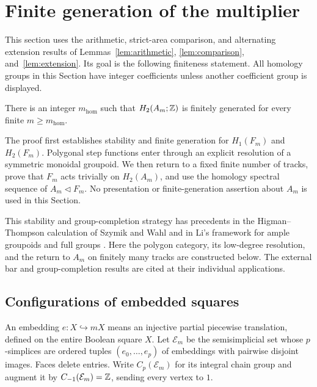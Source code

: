 \section{Finite generation of the multiplier}\label{sec:homology}

This section uses the arithmetic, strict-area comparison, and alternating
extension results of Lemmas~\ref{lem:arithmetic}, \ref{lem:comparison},
and~\ref{lem:extension}.  Its goal is
the following finiteness statement.  All homology groups in this Section have
integer coefficients unless another coefficient group is displayed.

\begin{theorem}\label{thm:multiplier}
There is an integer $m_{\mathrm{hom}}$ such that
$H_2(A_m;\mathbb Z)$ is finitely generated for every finite $m\geq m_{\mathrm{hom}}$.
\end{theorem}

The proof first establishes stability and finite generation for
$H_1(F_m)$ and $H_2(F_m)$.  Polygonal step functions enter through an explicit
resolution of a symmetric monoidal groupoid.  We then return to a fixed finite
number of tracks, prove that $F_m$ acts trivially on $H_2(A_m)$, and use the
homology spectral sequence of $A_m\triangleleft F_m$.  No presentation or
finite-generation assertion about $A_m$ is used in this Section.

This stability and group-completion strategy has precedents in the
Higman--Thompson calculation of Szymik and Wahl \cite{SzymikWahl2019}
and in Li's framework for ample groupoids and full groups
\cite{Li2025}.  Here the polygon category, its low-degree resolution,
and the return to $A_m$ on finitely many tracks are constructed below.
The external bar and group-completion results are cited at their
individual applications.

\subsection{Configurations of embedded squares}

An embedding $e:X\hookrightarrow mX$ means an injective partial piecewise
translation, defined on the entire Boolean square $X$.  Let $\mathcal E_m$ be
the semisimplicial set whose $p$-simplices are ordered tuples
$(e_0,\ldots,e_p)$ of embeddings with pairwise disjoint images.  Faces delete
entries.  Write $C_p(\mathcal E_m)$ for its integral chain group and augment
it by $C_{-1}(\mathcal E_m)=\mathbb Z$, sending every vertex to $1$.

